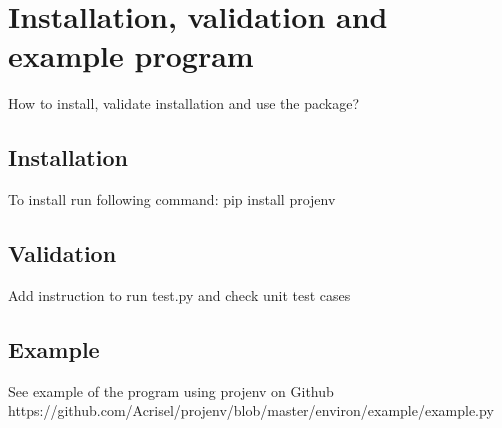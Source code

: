 \documentclass[design.tex]{subfiles}
\begin{document}
\chapter{Installation, validation and example program}
How to install, validate installation and use the package?

\section{Installation}

To install run following command:
pip install projenv

\section{Validation} 
Add instruction to run test.py and check unit test cases

\section{Example} 
See example of the program using projenv on Github
https://github.com/Acrisel/projenv/blob/master/environ/example/example.py
\end{document}
